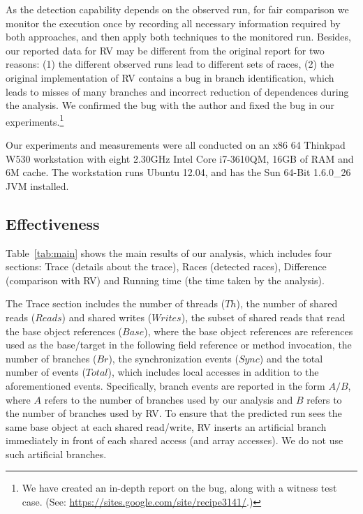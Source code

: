 As the detection capability  depends on the observed run, for fair 
comparison we monitor the execution once by recording all necessary 
information required by both approaches, and then apply both techniques 
to the monitored run. Besides, our reported data for RV may be different 
from the original report for two reasons: (1) the different observed runs 
lead to different sets of races, (2) the original implementation of RV 
contains a bug in branch identification, which leads to  misses of 
many branches and  incorrect reduction of dependences during the analysis. 
We confirmed the bug with the author and fixed the bug in our 
experiments.\footnote{We have created an in-depth report on the bug, 
along with a witness test case. (See:  \url{https://sites.google.com/site/recipe3141/}.)}


Our experiments and measurements were all conducted on an x86 64 
Thinkpad W530 workstation with eight 2.30GHz Intel Core i7-3610QM, 
16GB of RAM and 6M cache. The workstation runs Ubuntu 12.04,
and has the Sun 64-Bit 1.6.0\_26 JVM installed.










\subsection{Effectiveness}
Table~\ref{tab:main} shows the main results of our analysis, which includes four sections: Trace (details about the trace), Races (detected races), Difference (comparison with RV) and Running time (the time taken by the analysis).


The Trace section includes the number of threads ($Th$), the number of 
shared reads ($Reads$) and shared writes ($Writes$), the subset of shared 
reads that read the base object references  ($Base$), where the  base object 
references are references used as the base/target in the following field 
reference or method invocation,  the number of branches ($Br$), the 
synchronization events ($Sync$) and the total number of events ($Total$), 
which includes local accesses in addition to the aforementioned events. 
Specifically, branch events are reported in the form $A/B$, where $A$ refers 
to the number of branches used by our analysis and $B$ refers to the number 
of branches used by RV. To ensure that the predicted run sees the same 
base object at each shared read/write, {\sf RV} inserts an artificial 
branch immediately in front of each shared access (and array accesses). 
We do not use such artificial branches.


